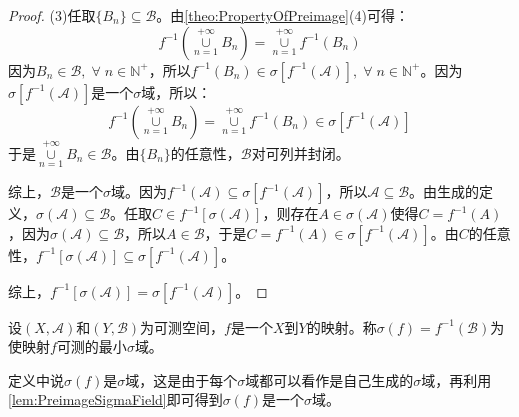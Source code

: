 \begin{proof}
	(3)任取$\{B_n\}\subseteq\mathscr{B}$。由\cref{theo:PropertyOfPreimage}(4)可得：
	\begin{equation*}
		f^{-1}\left(\underset{n=1}{\overset{+\infty}{\cup}}B_n\right)=\underset{n=1}{\overset{+\infty}{\cup}}f^{-1}(B_n)
	\end{equation*}
	因为$B_n\in\mathscr{B},\;\forall\;n\in\mathbb{N}^+$，所以$f^{-1}(B_n)\in\sigma[f^{-1}(\mathscr{A})],\;\forall\;n\in\mathbb{N}^+$。因为$\sigma[f^{-1}(\mathscr{A})]$是一个$\sigma$域，所以：
	\begin{equation*}
		f^{-1}\left(\underset{n=1}{\overset{+\infty}{\cup}}B_n\right)=\underset{n=1}{\overset{+\infty}{\cup}}f^{-1}(B_n)\in\sigma[f^{-1}(\mathscr{A})]
	\end{equation*}
	于是$\underset{n=1}{\overset{+\infty}{\cup}}B_n\in\mathscr{B}$。由$\{B_n\}$的任意性，$\mathscr{B}$对可列并封闭。\par
	综上，$\mathscr{B}$是一个$\sigma$域。因为$f^{-1}(\mathscr{A})\subseteq\sigma[f^{-1}(\mathscr{A})]$，所以$\mathscr{A}\subseteq\mathscr{B}$。由生成的定义，$\sigma(\mathscr{A})\subseteq\mathscr{B}$。任取$C\in f^{-1}[\sigma(\mathscr{A})]$，则存在$A\in\sigma(\mathscr{A})$使得$C=f^{-1}(A)$，因为$\sigma(\mathscr{A})\subseteq\mathscr{B}$，所以$A\in\mathscr{B}$，于是$C=f^{-1}(A)\in\sigma[f^{-1}(\mathscr{A})]$。由$C$的任意性，$f^{-1}[\sigma(\mathscr{A})]\subseteq\sigma[f^{-1}(\mathscr{A})]$。\par
	综上，$f^{-1}[\sigma(\mathscr{A})]=\sigma[f^{-1}(\mathscr{A})]$。
\end{proof}
\begin{definition}
	设$(X,\mathscr{A})$和$(Y,\mathscr{B})$为可测空间，$f$是一个$X$到$Y$的映射。称$\sigma(f)=f^{-1}(\mathscr{B})$为使映射$f$可测的最小$\sigma$域。
\end{definition}
\begin{note}
	定义中说$\sigma(f)$是$\sigma$域，这是由于每个$\sigma$域都可以看作是自己生成的$\sigma$域，再利用\cref{lem:PreimageSigmaField}即可得到$\sigma(f)$是一个$\sigma$域。
\end{note}
